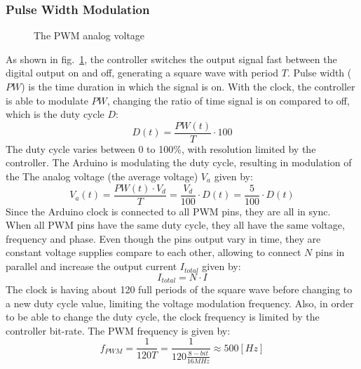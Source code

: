 \documentclass[\main/master.tex]{subfiles}
\begin{document}
\subsubsection{Pulse Width Modulation}
\begin{figure}[htbp]
	\centering
	\caption[The PWM analog voltage]{The PWM analog voltage}
	\label{fig:duty_cycle}
\end{figure}
\FloatBarrier
\par\noindent
As shown in fig.~\ref{fig:duty_cycle}, the controller switches the output signal fast between the digital output on and off, generating a square wave with period $T$. Pulse width ($PW$) is the time duration in which the signal is on. With the clock, the controller is able to modulate $PW$, changing the ratio of time signal is on compared to off, which is the duty cycle $D$:
\begin{equation}
D(t) = \frac{PW(t)}{T}\cdot 100  \label{eqn:duty cycle}
\end{equation}
The duty cycle varies between 0 to 100\%, with resolution limited by the controller. The Arduino is modulating the duty cycle, resulting in modulation of the The analog voltage (the average voltage) $V_a$ given by: 
\begin{equation}
V_a(t) = \frac{ PW(t)\cdot V_d}{ T}  = \frac{V_d}{100}\cdot D(t)  = \frac{5}{100}\cdot D(t)  \label{eqn:pwm voltage}
\end{equation}
Since the Arduino clock is connected to all PWM pins, they are all in sync. When all PWM pins have the same duty cycle, they all have the same voltage, frequency and phase. Even though the pins output vary in time, they are constant voltage supplies compare to each other, allowing to connect $N$ pins in parallel and increase the output current $I_{total}$ given by: 
\begin{equation}
I_{total} = N\cdot I   \label{eqn:pwm current}
\end{equation}
The clock is having about 120 full periods of the square wave before changing to a new duty cycle value, limiting the voltage modulation frequency. Also, in order to be able to change the duty cycle, the clock frequency is limited by the controller bit-rate. The PWM frequency is given by:
\begin{equation}
f_{PWM} = \frac{1 }{120T}= \frac{1 }{120 \frac{8-bit }{16MHz}}  \approx 500[Hz]	    \label{eqn:pwm frequency}
\end{equation}
\end{document}
